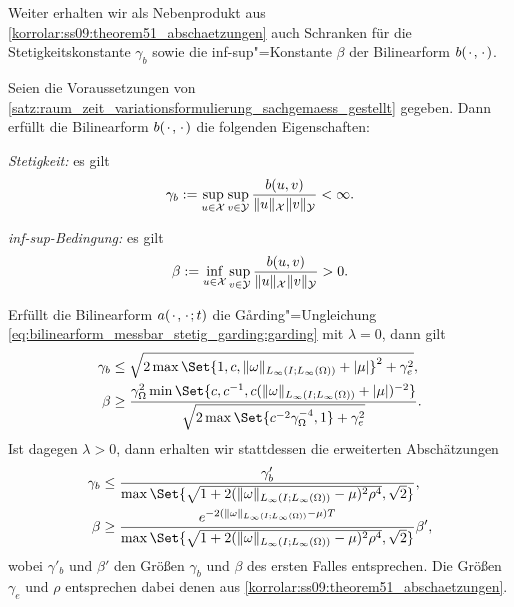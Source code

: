 Weiter erhalten wir als Nebenprodukt aus \cref{korrolar:ss09:theorem51_abschaetzungen} auch Schranken für die Stetigkeitskonstante $\gamma_{b}$ sowie die inf-sup"=Konstante $\beta$ der Bilinearform $b({\mkern2mu\cdot\mkern2mu}, {\mkern2mu\cdot\mkern2mu})$.

\begin{Korollar}
\label{korollar:rz_variationsformulierung_stetig_infsup_schranken}
    Seien die Voraussetzungen von \cref{satz:raum_zeit_variationsformulierung_sachgemaess_gestellt} gegeben.
    Dann erfüllt die Bilinearform $b({\mkern2mu\cdot\mkern2mu}, {\mkern2mu\cdot\mkern2mu})$ die folgenden Eigenschaften:
    \begin{thmenumerate}
        \item \emph{Stetigkeit:} es gilt
            \begin{equation}
                \gamma_{b} := \sup_{u \in \mathcal X} \sup_{v \in \mathcal Y} \frac{b(u, v)}{\lVert u\rVert_{\mathcal X} \lVert v\rVert_{\mathcal Y}} < \infty.
            \end{equation}
        \item \emph{inf-sup-Bedingung:} es gilt
            \begin{equation}
                \beta := \inf_{u \in \mathcal X} \sup_{v \in \mathcal Y} \frac{b(u, v)}{\lVert u\rVert_{\mathcal X} \lVert v\rVert_{\mathcal Y}} > 0.
            \end{equation}
    \end{thmenumerate}

    Erfüllt die Bilinearform $a({\mkern2mu\cdot\mkern2mu}, {\mkern2mu\cdot\mkern2mu}; t)$ die G\aa{}rding"=Ungleichung \cref{eq:bilinearform_messbar_stetig_garding:garding} mit $\lambda = 0$, dann gilt
    \begin{align}
        \gamma_{b}  &\leq \sqrt{2 \max\Set{ 1, c, \norm{\omega}_{L_{\infty}(I; L_{\infty}(\Omega))} + \abs{\mu} }^{2} + \gamma_{e}^{2} }, \\
        \beta &\geq \frac{\gamma_{\Omega}^{2} \min\Set{c, c^{-1}, c (\norm{\omega}_{L_{\infty}(I; L_{\infty}(\Omega))} + \abs{\mu})^{-2}}}{\sqrt{2 \max\Set{c^{-2}\gamma_{\Omega}^{-4}, 1} + \gamma_{e}^{2}}}.
    \end{align}
    Ist dagegen $\lambda > 0$, dann erhalten wir stattdessen die erweiterten Abschätzungen
    \begin{align}
        \gamma_{b} &\leq \frac{\gamma'_{b}}{\max\Set{\sqrt{1 + 2 (\norm{\omega}_{L_{\infty}(I; L_{\infty}(\Omega))} - \mu)^{2} \rho^{4} }, \sqrt{2}}}, \\
        \beta &\geq \frac{e^{-2(\norm{\omega}_{L_{\infty}(I; L_{\infty}(\Omega))} - \mu) T}}{\max\Set{\sqrt{1 + 2 (\norm{\omega}_{L_{\infty}(I; L_{\infty}(\Omega))} - \mu)^{2} \rho^{4} }, \sqrt{2}}} \beta',
    \end{align}
    wobei $\gamma'_{b}$ und $\beta'$ den Größen $\gamma_{b}$ und $\beta$ des ersten Falles entsprechen.
    Die Größen $\gamma_{e}$ und $\rho$ entsprechen dabei denen aus \cref{korrolar:ss09:theorem51_abschaetzungen}.


\end{Korollar}
